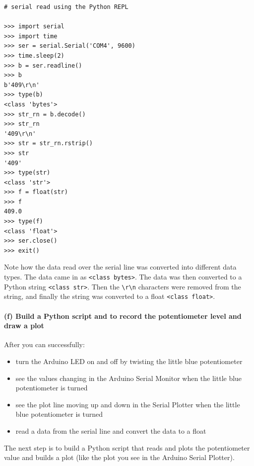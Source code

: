\documentclass[11pt]{article}
\providecommand{\tightlist}{%
      \setlength{\itemsep}{0pt}\setlength{\parskip}{0pt}}
\begin{document}
\begin{verbatim}
# serial read using the Python REPL

>>> import serial
>>> import time
>>> ser = serial.Serial('COM4', 9600)
>>> time.sleep(2)
>>> b = ser.readline()
>>> b
b'409\r\n'
>>> type(b)
<class 'bytes'>
>>> str_rn = b.decode()
>>> str_rn
'409\r\n'
>>> str = str_rn.rstrip()
>>> str
'409'
>>> type(str)
<class 'str'>
>>> f = float(str)
>>> f
409.0
>>> type(f)
<class 'float'>
>>> ser.close()
>>> exit()
\end{verbatim}

Note how the data read over the serial line was converted into different
data types. The data came in as
\texttt{\textless{}class\ \textquotesingle{}bytes\textquotesingle{}\textgreater{}}.
The data was then converted to a Python string
\texttt{\textless{}class\ \textquotesingle{}str\textquotesingle{}\textgreater{}}.
Then the \texttt{\textbackslash{}r\textbackslash{}n} characters were
removed from the string, and finally the string was converted to a float
\texttt{\textless{}class\ \textquotesingle{}float\textquotesingle{}\textgreater{}}.

    \hypertarget{f-build-a-python-script-and-to-record-the-potentiometer-level-and-draw-a-plot}{%
\paragraph{(f) Build a Python script and to record the potentiometer
level and draw a
plot}\label{f-build-a-python-script-and-to-record-the-potentiometer-level-and-draw-a-plot}}

After you can successfully:

\begin{itemize}
\tightlist
\item
  turn the Arduino LED on and off by twisting the little blue
  potentiometer
\item
  see the values changing in the Arduino Serial Monitor when the little
  blue potentiometer is turned
\item
  see the plot line moving up and down in the Serial Plotter when the
  little blue potentiometer is turned
\item
  read a data from the serial line and convert the data to a float
\end{itemize}

The next step is to build a Python script that reads and plots the
potentiometer value and builds a plot (like the plot you see in the
Arduino Serial Plotter).
\end{document}
